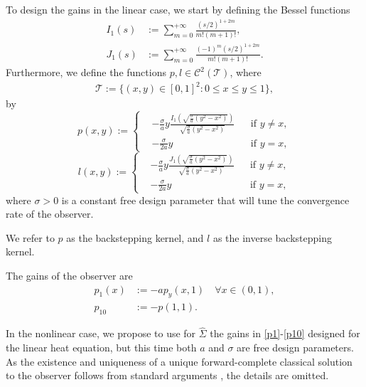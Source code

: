 \documentclass[twocolumn]{autart}
\begin{document}
To design the gains in the linear case, we start by defining the Bessel functions
\begin{align}
I_1(s) &:= \sum_{m=0}^{+\infty} \frac{(s/2)^{1+2m}}{m!(m+1)!}, \label{bessel_I}\\
J_1(s) &:= \sum_{m=0}^{+\infty} \frac{(-1)^m(s/2)^{1+2m}}{m!(m+1)!}.\label{bessel_J}
\end{align}
Furthermore, we define the functions $p, l \in \mathscr{C}^2(\mathcal{T})$, where 
\begin{align}
\mathcal{T} := \{(x,y)\in [0,1]^2 : 0\leq x\leq y\leq 1\},
\end{align}
by 
\begin{equation}\label{kernel_1}
p(x,y) := 
\left\lbrace 
\begin{aligned}
&-\frac{\sigma}{a} y\frac{I_1\left(\sqrt{\frac{\sigma}{a} (y^2-x^2)}\right)}{\sqrt{\frac{\sigma}{a} (y^2-x^2)}} &&\text{if $y\neq x$}, \\
&-\frac{\sigma}{2a}y &&\text{if $y=x$},
\end{aligned}
\right. 
\end{equation}
\begin{equation}\label{kernel_inv}
l(x,y) := 
\left\lbrace 
\begin{aligned}
&-\frac{\sigma}{a} y\frac{J_1\left(\sqrt{\frac{\sigma}{a} (y^2-x^2)}\right)}{\sqrt{\frac{\sigma}{a} (y^2-x^2)}} &&\text{if $y\neq x$}, \\
&-\frac{\sigma}{2a}y &&\text{if $y=x$},
\end{aligned}
\right. 
\end{equation}
where $\sigma>0$ is a constant free design parameter that will tune the convergence rate of the observer. 

We refer to $p$ as the backstepping kernel, and $l$ as the inverse backstepping kernel. 

The gains of the observer are 
\begin{align}
p_1(x) &:= -a p_y(x,1) \quad \forall x\in (0,1), \label{p1}\\
p_{10} &:= -p(1,1). \label{p10}
\end{align}


In the nonlinear case, we propose to use for $\hat{\Sigma}$ the gains in \eqref{p1}-\eqref{p10} designed for the linear heat equation, but this time both $a$ and $\sigma$ are free design parameters. As the existence and uniqueness of a unique forward-complete classical solution to the observer follows from standard arguments \cite[Chapter V]{ladyzen}, the details are omitted.
\end{document}
